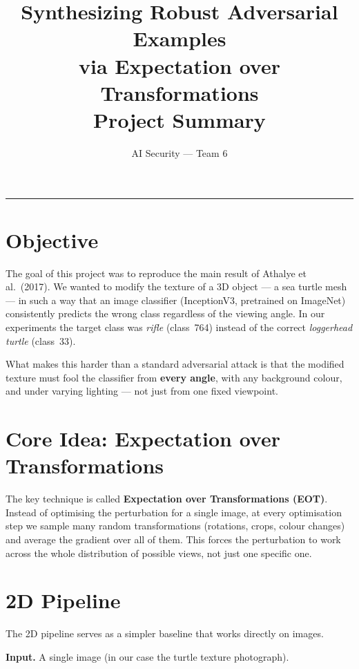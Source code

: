 \documentclass[11pt,a4paper]{article}
\title{\textbf{Synthesizing Robust Adversarial Examples\\via Expectation over Transformations}\\[4pt]
\large Project Summary}
\author{AI Security --- Team 6}
\date{}
\begin{document}
\maketitle
\vspace{-8pt}
\hrule
\vspace{6pt}

\section{Objective}

The goal of this project was to reproduce the main result of Athalye et al.\ (2017).
We wanted to modify the texture of a 3D object --- a sea turtle mesh --- in such a way
that an image classifier (InceptionV3, pretrained on ImageNet) consistently predicts
the wrong class regardless of the viewing angle.
In our experiments the target class was \textit{rifle} (class~764)
instead of the correct \textit{loggerhead turtle} (class~33).

What makes this harder than a standard adversarial attack is that the modified texture
must fool the classifier from \textbf{every angle}, with any background colour,
and under varying lighting --- not just from one fixed viewpoint.

\section{Core Idea: Expectation over Transformations}

The key technique is called \textbf{Expectation over Transformations (EOT)}.
Instead of optimising the perturbation for a single image,
at every optimisation step we sample many random transformations
(rotations, crops, colour changes) and average the gradient over all of them.
This forces the perturbation to work across the whole distribution of
possible views, not just one specific one.

\section{2D Pipeline}

The 2D pipeline serves as a simpler baseline that works directly on images.

\textbf{Input.} A single image (in our case the turtle texture photograph).
\end{document}
